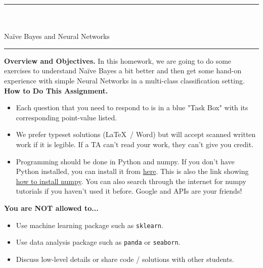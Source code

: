 \documentclass[a4paper,10pt]{article}
\begin{document}

\sffamily

\newcommand{\nb}{Na\"ive Bayes\xspace}

\begin{center}
\noindent\rule{\textwidth}{1pt}\\[10pt]
{\color{blue!60}{CS434 Machine Learning and Data Mining -- Homework 3}}\\[10pt]
{\LARGE \nb and Neural Networks }\\[10pt]

\noindent\rule{\textwidth}{1pt}
\end{center}

\noindent\textbf{Overview and Objectives.} In this homework, we are going to do some exercises to understand \nb a bit better and then get some hand-on experience with simple Neural Networks in a multi-class classification setting.\\

\noindent\textbf{How to Do This Assignment.}
\begin{itemize}
    \item Each question that you need to respond to is in a blue "Task Box" with its corresponding point-value listed. 
    \item We prefer typeset solutions (\LaTeX~/ Word) but will accept scanned written work if it is legible. If a TA can't read your work, they can't give you credit. 
    \item Programming should be done in Python and numpy. If you don't have Python installed, you can install it from \href{https://www.python.org/downloads/}{here}. This is also the link showing \href{https://numpy.org/install/}{how to install numpy}. You can also search through the internet for numpy tutorials if you haven't used it before. Google and APIs are your friends!
\end{itemize}

\noindent\textbf{You are {\color{red}NOT} allowed to...}
\begin{itemize}
    \item Use machine learning package such as \lstinline{sklearn}. 
    \item Use data analysis package such as \lstinline{panda} or \lstinline{seaborn}.
    \item Discuss low-level details or share code / solutions with other students.
\end{itemize}
\end{document}

